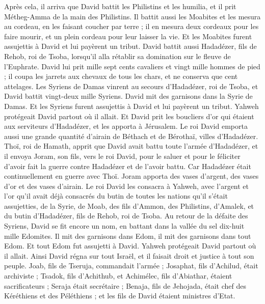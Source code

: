 \begin{multicols}{2}
\VerseOne{}Après cela, il arriva que David battit les Philistins et les humilia, et il prit Métheg-Amma de la main des Philistins.
Il battit aussi les Moabites et les mesura au cordeau, en les faisant coucher par terre ; il en mesura deux cordeaux pour les faire mourir, et un plein cordeau pour leur laisser la vie. Et les Moabites furent assujettis à David et lui payèrent un tribut.
David battit aussi Hadadézer, fils de Rehob, roi de Tsoba, lorsqu'il alla rétablir sa domination sur le fleuve de l'Euphrate.
David lui prit mille sept cents cavaliers et vingt mille hommes de pied ; il coupa les jarrets aux chevaux de tous les chars, et ne conserva que cent attelages.
Les Syriens de Damas vinrent au secours d'Hadadézer, roi de Tsoba, et David battit vingt-deux mille Syriens.
David mit des garnisons dans la Syrie de Damas. Et les Syriens furent assujettis à David et lui payèrent un tribut. Yahweh protégeait David partout où il allait.
Et David prit les boucliers d'or qui étaient aux serviteurs d'Hadadézer, et les apporta à Jérusalem.
Le roi David emporta aussi une grande quantité d'airain de Béthach et de Bérothaï, villes d'Hadadézer.
Thoï, roi de Hamath, apprit que David avait battu toute l'armée d'Hadadézer,
et il envoya Joram, son fils, vers le roi David, pour le saluer et pour le féliciter d'avoir fait la guerre contre Hadadézer et de l'avoir battu. Car Hadadézer était continuellement en guerre avec Thoï. Joram apporta des vases d'argent, des vases d'or et des vases d'airain.
Le roi David les consacra à Yahweh, avec l'argent et l'or qu'il avait déjà consacrés du butin de toutes les nations qu'il s'était assujetties,
de la Syrie, de Moab, des fils d'Ammon, des Philistins, d'Amalek, et du butin d'Hadadézer, fils de Rehob, roi de Tsoba.
Au retour de la défaite des Syriens, David se fit encore un nom, en battant dans la vallée du sel dix-huit mille Edomites.
Il mit des garnisons dans Edom, il mit des garnisons dans tout Edom. Et tout Edom fut assujetti à David. Yahweh protégeait David partout où il allait.
Ainsi David régna sur tout Israël, et il faisait droit et justice à tout son peuple.
Joab, fils de Tseruja, commandait l'armée ; Josaphat, fils d'Achilud, était archiviste ;
Tsadok, fils d'Achithub, et Achimélec, fils d'Abiathar, étaient sacrificateurs ; Seraja était secrétaire ;
Benaja, fils de Jehojada, était chef des Kéréthiens et des Péléthiens ; et les fils de David étaient ministres d'Etat.

\end{multicols}
